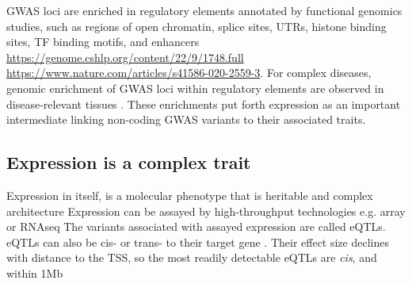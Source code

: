 \begin{outline}
\1 \gls{GWAS} loci are enriched in regulatory elements annotated by functional genomics studies, such as
    regions of open chromatin, 
    splice sites, 
    UTRs,
    histone binding sites, 
    \gls{TF} binding motifs,
    and enhancers \autocite{trynka2015DisentanglingEffectsColocalizing,gallagher2018PostGWASEraAssociation} \url{https://genome.cshlp.org/content/22/9/1748.full} \url{https://www.nature.com/articles/s41586-020-2559-3}.
\2 For complex diseases, genomic enrichment of GWAS loci within regulatory elements are observed in disease-relevant tissues \autocite{visscher201710YearsGWAS}.
\2 These enrichments put forth expression as an important intermediate linking non-coding \gls{GWAS} variants to their associated traits.

\subsection{Expression is a complex trait}

\1 Expression in itself, is a molecular phenotype that is heritable and complex architecture \autocite{gaffney2013GlobalPropertiesFunctional}
    \2 Expression can be assayed by high-throughput technologies e.g. array or RNAseq
    \2 The variants associated with assayed expression are called \glspl{eQTL}.
    \2 eQTLs can also be cis- or trans- to their target gene \autocite{albert2015RoleRegulatoryVariation}.
    \2 Their effect size declines with distance to the TSS, so the most readily detectable eQTLs are \textit{cis}, and within 1Mb \autocite{vandiedonck2017GeneticAssociationMolecular}


\end{outline}
